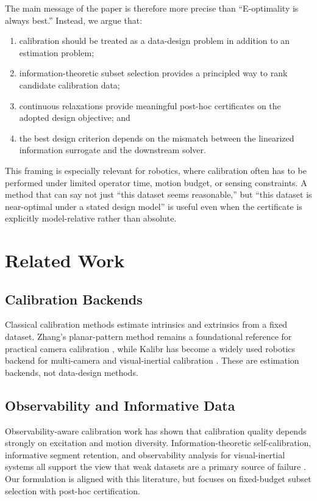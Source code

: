 \documentclass[11pt]{article}
\begin{document}
The main message of the paper is therefore more precise than ``E-optimality is
always best.'' Instead, we argue that:
\begin{enumerate}[leftmargin=1.5em]
    \item calibration should be treated as a data-design problem in addition to
    an estimation problem;
    \item information-theoretic subset selection provides a principled way to
    rank candidate calibration data;
    \item continuous relaxations provide meaningful post-hoc certificates on the
    adopted design objective; and
    \item the best design criterion depends on the mismatch between the
    linearized information surrogate and the downstream solver.
\end{enumerate}

This framing is especially relevant for robotics, where calibration often has to
be performed under limited operator time, motion budget, or sensing constraints.
A method that can say not just ``this dataset seems reasonable,'' but ``this
dataset is near-optimal under a stated design model'' is useful even when the
certificate is explicitly model-relative rather than absolute.

\section{Related Work}
\subsection{Calibration Backends}
Classical calibration methods estimate intrinsics and extrinsics from a fixed
dataset. Zhang's planar-pattern method remains a foundational reference for
practical camera calibration \citep{zhang2000flexible}, while Kalibr has become
a widely used robotics backend for multi-camera and visual-inertial calibration
\citep{furgale2013kalibr,kalibr_toolbox}. These are estimation backends, not
data-design methods.

\subsection{Observability and Informative Data}
Observability-aware calibration work has shown that calibration quality depends
strongly on excitation and motion diversity. Information-theoretic
self-calibration, informative segment retention, and observability analysis for
visual-inertial systems all support the view that weak datasets are a primary
source of failure
\citep{maye2013self,schneider2017informative,schneider2019observability,yang2023online}.
Our formulation is aligned with this literature, but focuses on fixed-budget
subset selection with post-hoc certification.
\end{document}
